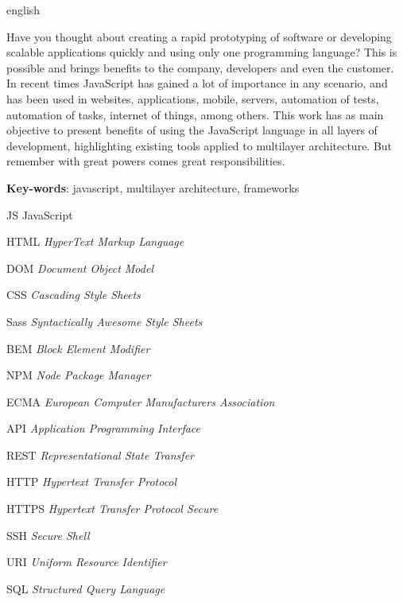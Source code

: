 \documentclass[
	12pt,				%
	openright,			%
	twoside,			%
	a4paper,			%
	english,			%
	brazil				%
	]{abntex2}
\begin{document}
\begin{resumo}[Abstract]
 \begin{otherlanguage*}{english}

Have you thought about creating a rapid prototyping of software or developing scalable applications quickly and using only one programming language? This is possible and brings benefits to the company, developers and even the customer. In recent times JavaScript has gained a lot of importance in any scenario, and has been used in websites, applications, mobile, servers, automation of tests, automation of tasks, internet of things, among others. This work has as main objective to present benefits of using the JavaScript language in all layers of development, highlighting existing tools applied to multilayer architecture. But remember with great powers comes great responsibilities.

   \vspace{\onelineskip}
 
   \noindent 
   \textbf{Key-words}: javascript, multilayer architecture, frameworks
 \end{otherlanguage*}
\end{resumo}
\listoffigures*
\cleardoublepage


\begin{siglas}
  \item[JS] JavaScript
  \item[HTML] \textit{HyperText Markup Language}
  \item[DOM] \textit{Document Object Model}
  \item[CSS] \textit{Cascading Style Sheets}
  \item[Sass] \textit{Syntactically Awesome Style Sheets} 
  \item[BEM] \textit{Block Element Modifier} 
  \item[NPM] \textit{Node Package Manager} 
  \item[ECMA] \textit{European Computer Manufacturers Association}
  \item[API] \textit{Application Programming Interface}
  \item[REST] \textit{Representational State Transfer}
  \item[HTTP] \textit{Hypertext Transfer Protocol}
  \item[HTTPS] \textit{Hypertext Transfer Protocol Secure}
  \item[SSH] \textit{Secure Shell}  
  \item[URI] \textit{Uniform Resource Identifier}
  \item[SQL] \textit{Structured Query Language}
\end{siglas}
\end{document}
